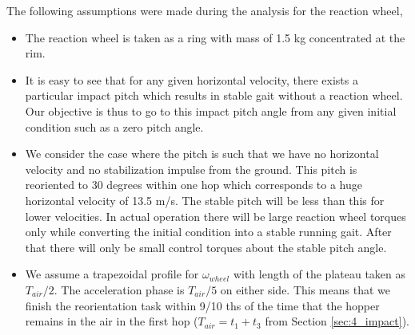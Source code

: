 The following assumptions were made during the analysis for the reaction wheel,
\begin{itemize}
\item
The reaction wheel is taken as a ring with mass of 1.5 kg concentrated at the rim.
\item 
It is easy to see that for any given horizontal velocity, there exists a particular impact pitch which results in stable gait without a reaction wheel. Our objective is thus to go to this impact pitch angle from any
given initial condition such as a zero pitch angle.
\item
We consider the case where the pitch is such that we have no horizontal velocity and no stabilization impulse from the ground. This pitch is reoriented to 30 degrees within one hop which corresponds to a huge horizontal velocity of 13.5 m/s. The stable pitch will be less than this for lower velocities. In actual operation
there will be large reaction wheel torques only while converting the initial condition into a stable
running gait. After that there will only be small control torques about the stable pitch angle.
\item
We assume a trapezoidal profile for $\omega_{wheel}$ with length of the plateau taken as $T_{air}/2$. The acceleration phase is
$T_{air}/5$ on either side. This means that we finish the reorientation task within 9/10 ths of the time that the hopper remains in the air in the first hop ($T_{air} = t_1 + t_3$ from Section \ref{sec:4_impact}).
\end{itemize}


